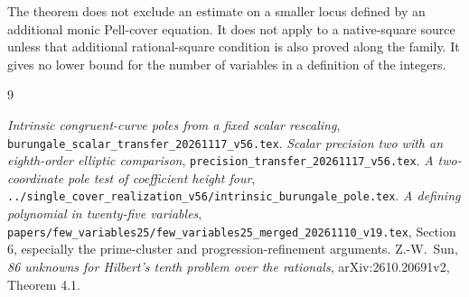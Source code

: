 \documentclass[11pt,a4paper]{article}
\begin{document}
The theorem does not exclude an estimate on a smaller locus defined
by an additional monic Pell-cover equation. It does not apply to a
native-square source unless that additional rational-square condition
is also proved along the family. It gives no lower bound for the
number of variables in a definition of the integers.

\begin{thebibliography}{9}\raggedright
{}\emph{Intrinsic congruent-curve poles from a fixed scalar
rescaling},
\nolinkurl{burungale_scalar_transfer_20261117_v56.tex}.
\emph{Scalar precision two with an eighth-order
elliptic comparison},
\nolinkurl{precision_transfer_20261117_v56.tex}.
\emph{A two-coordinate pole test of coefficient height
four},
\nolinkurl{../single_cover_realization_v56/intrinsic_burungale_pole.tex}.
\emph{A defining polynomial in twenty-five variables},
\nolinkurl{papers/few_variables25/few_variables25_merged_20261110_v19.tex},
Section 6, especially the prime-cluster and progression-refinement
arguments.
Z.-W.~Sun, \emph{86 unknowns for Hilbert's tenth problem
over the rationals}, arXiv:2610.20691v2, Theorem 4.1.
\end{thebibliography}
\end{document}

